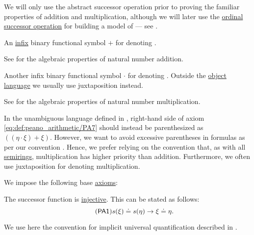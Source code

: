 \begin{definition}
\begin{thmenum}[series=def:peano_arithmetic]
    We will only use the abstract successor operation prior to proving the familiar properties of addition and multiplication, although we will later use the \hyperref[def:ordinal_successor]{ordinal successor operation} for building a model of  --- see .

     An \hyperref[rem:first_order_formula_conventions/infix]{infix} binary functional symbol \( + \) for denoting .

    See  for the algebraic properties of natural number addition.

     Another infix binary functional symbol \( \cdot \) for denoting . Outside the \hyperref[rem:metalogic]{object language} we usually use juxtaposition instead.

    See  for the algebraic properties of natural number multiplication.

    In the unambiguous language defined in , right-hand side of axiom \eqref{eq:def:peano_arithmetic/PA7} should instead be parenthesized as \( ((\eta \cdot \xi) + \xi) \). However, we want to avoid excessive parentheses in formulas as per our convention . Hence, we prefer relying on the convention that, as with all \hyperref[def:semiring]{semirings}, multiplication has higher priority than addition. Furthermore, we often use juxtaposition for denoting multiplication.
  \end{thmenum}

  We impose the following base \hyperref[def:first_order_theory/axiomatized]{axioms}:
  \begin{thmenum}[resume=def:peano_arithmetic]
     The successor function is \hyperref[thm:function_invertibility_categorical/nonempty_left_invertible]{injective}. This can be stated as follows:
    \begin{equation}\label{eq:def:peano_arithmetic/PA1}\tag{\logic{PA1}}
      s(\xi) \doteq s(\eta) \rightarrow \xi \doteq \eta.
    \end{equation}

    We use here the convention for implicit universal quantification described in .


\end{thmenum}
\end{definition}
